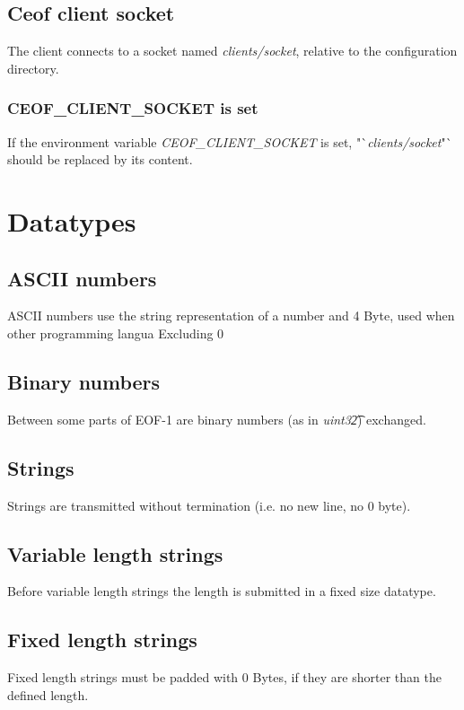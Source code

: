 \documentclass[12pt,a4paper]{article}
\begin{document}
\subsection{Ceof client socket}
The client connects to a socket named \textit{clients/socket}, relative
to the configuration directory.
\subsubsection{CEOF\_CLIENT\_SOCKET is set}
If the environment variable \textit{CEOF\_CLIENT\_SOCKET} is set,
"`\textit{clients/socket}"` should be replaced by its content.
\section{Datatypes}
\subsection{ASCII numbers}
ASCII numbers use the string representation of a number and
4 Byte, used when other programming langua
Excluding 0
\subsection{Binary numbers}
Between some parts of EOF-1 are binary numbers (as in \textit{uint32\t})
exchanged.
\subsection{Strings}
Strings are transmitted without termination (i.e. no new line, no 0 byte).
\subsection{Variable length strings}
Before variable length strings the length is submitted in a fixed size
datatype.
\subsection{Fixed length strings}
Fixed length strings must be padded with 0 Bytes, if they are shorter
than the defined length.
\end{document}
